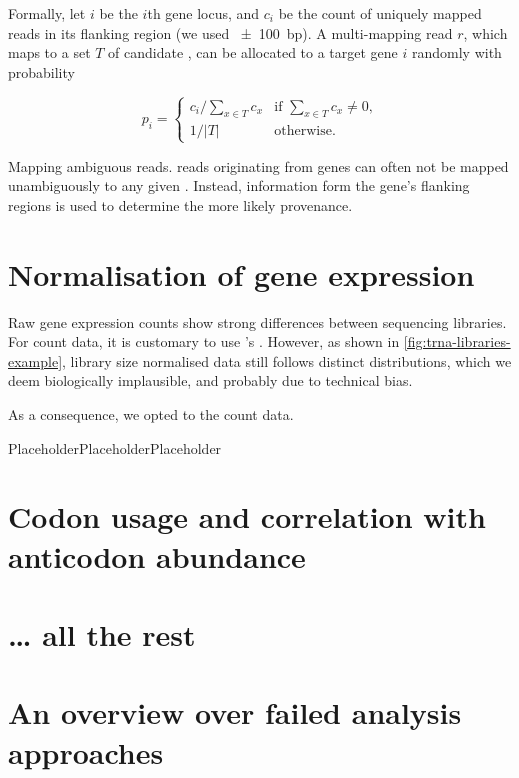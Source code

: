Formally, let \(i\) be the \(i\)th \trna gene locus, and \(c_i\) be the count of
uniquely mapped reads in its flanking region (we used \SI{\pm100}{bp}). A
multi-mapping read \(r\), which maps to a set \(T\) of candidate \trna[s], can
be allocated to a target \trna gene \(i\) randomly with probability

\begin{equation}
    p_i = \begin{cases}
        {c_i}/{\sum_{x \in T}c_x} & \text{if \(\sum_{x \in T}c_x \neq 0\),} \\
        {1}/{\vert T \rvert} & \text{otherwise.}
    \end{cases}
\end{equation}

    {Mapping ambiguous \chip reads.}
    {\chip reads originating from \trna genes can often not be mapped
    unambiguously to any given \trna. Instead, information form the gene’s
    flanking regions is used to determine the more likely provenance.}

\section{Normalisation of \trna gene expression}

Raw \trna gene expression counts show strong differences between sequencing
libraries. For \mrna count data, it is customary to use ’s
 \citep{Anders:2010}. However, as shown in
\cref{fig:trna-libraries-example}, library size normalised data still follows
distinct distributions, which we deem biologically implausible, and probably due
to technical bias.

As a consequence, we opted to  the count data.

    {\Huge Placeholder}{Placeholder}{Placeholder}

\section{Codon usage and correlation with anticodon abundance}

\section{… all the rest}

\section{An overview over failed analysis approaches}
